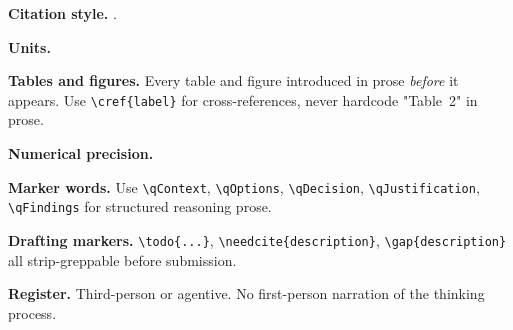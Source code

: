 
\begin{notesbox}
\small

\textbf{Citation style.} .

\textbf{Units.} 

\textbf{Tables and figures.} Every table and figure introduced in prose
\emph{before} it appears. Use \texttt{\textbackslash cref\{label\}} for
cross-references, never hardcode "Table~2" in prose.

\textbf{Numerical precision.} 

\textbf{Marker words.} Use \texttt{\textbackslash qContext},
\texttt{\textbackslash qOptions}, \texttt{\textbackslash qDecision},
\texttt{\textbackslash qJustification}, \texttt{\textbackslash qFindings} for
structured reasoning prose.

\textbf{Drafting markers.} \texttt{\textbackslash todo\{...\}},
\texttt{\textbackslash needcite\{description\}}, \texttt{\textbackslash gap\{description\}}
all strip-greppable before submission.

\textbf{Register.} Third-person or agentive. No first-person narration
of the thinking process.

\end{notesbox}

